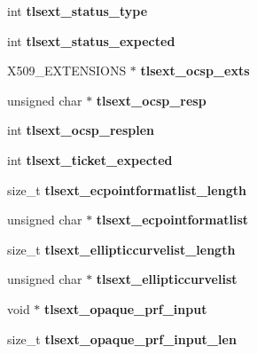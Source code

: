 \begin{DoxyCompactItemize}
int {\bfseries tlsext\+\_\+status\+\_\+type}
\item 
\mbox{\label{structssl__st_a0a0d75de2cdedb99c07403d56aa9ae8c}} 
int {\bfseries tlsext\+\_\+status\+\_\+expected}
\item 
\mbox{\label{structssl__st_a234c465dc9c34dde4ac3cc24a79467a1}} 
X509\+\_\+\+E\+X\+T\+E\+N\+S\+I\+O\+NS $\ast$ {\bfseries tlsext\+\_\+ocsp\+\_\+exts}
\item 
\mbox{\label{structssl__st_ab54a13d08a8b115b2a7897c9213b1fb7}} 
unsigned char $\ast$ {\bfseries tlsext\+\_\+ocsp\+\_\+resp}
\item 
\mbox{\label{structssl__st_a4a86cdf17eb779e0d6e467105103eb5f}} 
int {\bfseries tlsext\+\_\+ocsp\+\_\+resplen}
\item 
\mbox{\label{structssl__st_ac3163b212ec333ebcfba794e683be1d2}} 
int {\bfseries tlsext\+\_\+ticket\+\_\+expected}
\item 
\mbox{\label{structssl__st_a1661bf580598984c531b321c0a005d37}} 
size\+\_\+t {\bfseries tlsext\+\_\+ecpointformatlist\+\_\+length}
\item 
\mbox{\label{structssl__st_a000e3639718d5d28e610cca71c0ee995}} 
unsigned char $\ast$ {\bfseries tlsext\+\_\+ecpointformatlist}
\item 
\mbox{\label{structssl__st_ac0a9a07be2d0e0f83b0844b61e82d06f}} 
size\+\_\+t {\bfseries tlsext\+\_\+ellipticcurvelist\+\_\+length}
\item 
\mbox{\label{structssl__st_af2e7ed3a280b3afb8d42ea9f9aa45637}} 
unsigned char $\ast$ {\bfseries tlsext\+\_\+ellipticcurvelist}
\item 
\mbox{\label{structssl__st_a25e40e842200910b02ec2191da0f5f62}} 
void $\ast$ {\bfseries tlsext\+\_\+opaque\+\_\+prf\+\_\+input}
\item 
\mbox{\label{structssl__st_a83b5b006619d33cb3bd36b0b03288e9f}} 
size\+\_\+t {\bfseries tlsext\+\_\+opaque\+\_\+prf\+\_\+input\+\_\+len}

\end{DoxyCompactItemize}
